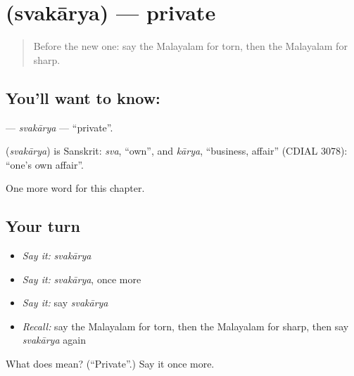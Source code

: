 \section[\texorpdfstring{\ml{സ്വകാര്യ} (svakārya)}{സ്വകാര്യ (svakārya)}]{ (svakārya) — private}

\label{lesson:ML-C244-svakarya}



\begin{quote}
Before the new one: say the Malayalam for torn, then the Malayalam for sharp.
\end{quote}

\subsection*{You'll want to know: }
\textbf{} — \emph{svakārya} — \textquotedblleft{}private\textquotedblright{}.

\begin{cousinweb}
\textbf{} (\emph{svakārya}) is Sanskrit: \emph{sva}, \textquotedblleft{}own\textquotedblright{}, and \emph{kārya}, \textquotedblleft{}business, affair\textquotedblright{} (CDIAL 3078): \textquotedblleft{}one's own affair\textquotedblright{}.
\end{cousinweb}

\begin{grammarlens}[title={What you've built}]
One more word for this chapter.
\end{grammarlens}

\subsection*{Your turn}
\begin{itemize}
\raggedright
  \item \emph{Say it:} \emph{svakārya}
  \item \emph{Say it:} \emph{svakārya}, once more
  \item \emph{Say it:} say \emph{svakārya}
  \item \emph{Recall:} say the Malayalam for torn, then the Malayalam for sharp, then say \emph{svakārya} again
\end{itemize}

\begin{tcolorbox}[breakable,colback=teal!4,colframe=teal!35!black,title={Before you move on}]
What does  mean? (\textquotedblleft{}Private\textquotedblright{}.) Say it once more.
\end{tcolorbox}
